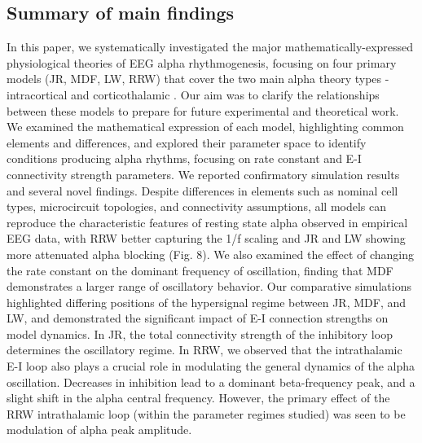 \documentclass[12pt,twoside]{article}
\begin{document}
\subsection{Summary of main findings}
In this paper, we systematically investigated the major mathematically-expressed physiological theories of EEG alpha rhythmogenesis, focusing on four primary models (JR, MDF, LW, RRW) that cover the two main alpha theory types - intracortical and corticothalamic \citep{nunez2006electric}. Our aim was to clarify the relationships between these models to prepare for future experimental and theoretical work. We examined the mathematical expression of each model, highlighting common elements and differences, and explored their parameter space to identify conditions producing alpha rhythms, focusing on rate constant and E-I connectivity strength parameters. We reported confirmatory simulation results and several novel findings. Despite differences in elements such as nominal cell types, microcircuit topologies, and connectivity assumptions, all models can reproduce the characteristic features of resting state alpha observed in empirical EEG data, with RRW better capturing the 1/f scaling and JR and LW showing more attenuated alpha blocking (Fig. 8). We also examined the effect of changing the rate constant on the dominant frequency of oscillation, finding that MDF demonstrates a larger range of oscillatory behavior. Our comparative simulations highlighted differing positions of the hypersignal regime between JR, MDF, and LW, and demonstrated the significant impact of E-I connection strengths on model dynamics. In JR, the total connectivity strength of the inhibitory loop determines the oscillatory regime. In RRW, we observed that the intrathalamic E-I loop also plays a crucial role in modulating the general dynamics of the alpha oscillation. Decreases in inhibition lead to a dominant beta-frequency peak, and a slight shift in the alpha central frequency. However, the primary effect of the RRW intrathalamic loop (within the parameter regimes studied) was seen to be modulation of alpha peak amplitude. 
\end{document}
